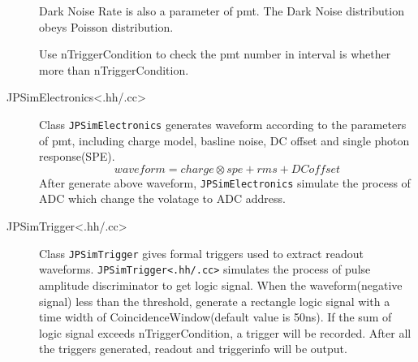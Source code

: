 \begin{description}
    Dark Noise Rate is also a parameter of pmt. The Dark Noise distribution obeys Poisson distribution.

    Use nTriggerCondition to check the pmt number in interval is whether more than nTriggerCondition.
    \item[JPSimElectronics<.hh/.cc>] Class \texttt{JPSimElectronics} generates waveform according to the parameters of pmt, including charge model, basline noise, DC offset and single photon response(SPE).
    \[waveform=charge\otimes spe+rms+DCoffset\]
    After generate above waveform, \texttt{JPSimElectronics} simulate the process of ADC which change the volatage to ADC address.
    
    \item[JPSimTrigger<.hh/.cc>] Class \texttt{JPSimTrigger} gives formal triggers used to extract readout waveforms.
    \texttt{JPSimTrigger<.hh/.cc>} simulates the process of pulse amplitude discriminator to get logic signal. 
    When the waveform(negative signal) less than the threshold, generate a rectangle logic signal with
    a time width of CoincidenceWindow(default value is 50ns). If the sum of logic signal exceeds nTriggerCondition, a trigger will be
    recorded. After all the triggers generated, readout and triggerinfo will be output.
\end{description}

